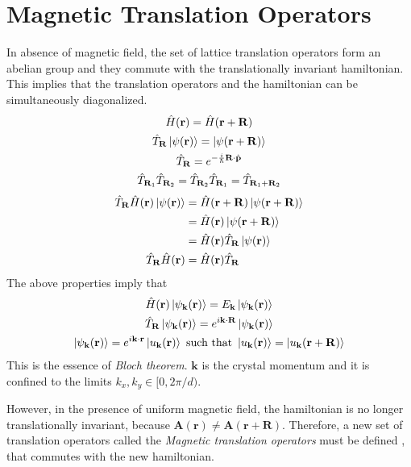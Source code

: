 \section{Magnetic Translation Operators}
In absence of magnetic field, the set of lattice translation operators form an abelian group and they commute with the translationally invariant hamiltonian. This implies that the translation operators 
and the hamiltonian can be simultaneously diagonalized.
\begin{gather}
\hat{H}(\mathbf{r}) = \hat{H}(\mathbf{r} + \mathbf{R}) \nonumber \\
 \hat{T}_{\mathbf{R}}\ket{\psi(\mathbf{r})} = \ket{\psi(\mathbf{r} + \mathbf{R})} \\
 \hat{T}_{\mathbf{R}} = e^{-\frac{i}{\hbar}\mathbf{R}\cdot\hat{\mathbf{p}}} \\
 \hat{T}_{\mathbf{R}_1}\hat{T}_{\mathbf{R}_2} = \hat{T}_{\mathbf{R}_2}\hat{T}_{\mathbf{R}_1} = \hat{T}_{\mathbf{R}_1 + \mathbf{R}_2}
\end{gather}
\begin{align}
 \hat{T}_{\mathbf{R}}\hat{H}(\mathbf{r})\ket{\psi(\mathbf{r})} &= \hat{H}(\mathbf{r} + \mathbf{R})\ket{\psi(\mathbf{r} + \mathbf{R})} \nonumber \\
 &= \hat{H}(\mathbf{r})\ket{\psi(\mathbf{r} + \mathbf{R})} \nonumber \\
 &= \hat{H}(\mathbf{r})\hat{T}_{\mathbf{R}}\ket{\psi({\mathbf{r})}} \nonumber \\
 \hat{T}_{\mathbf{R}}\hat{H}(\mathbf{r}) &= \hat{H}(\mathbf{r})\hat{T}_{\mathbf{R}}
\end{align} The above properties imply that \cite{ashcroft2010solid, snoke2009solid, jain2007composite}
\begin{gather}
 \hat{H}(\mathbf{r})\ket{\psi_{\mathbf{k}}(\mathbf{r})} = E_{\mathbf{k}}\ket{\psi_{\mathbf{k}}(\mathbf{r})} \\
 \hat{T}_{\mathbf{R}}\ket{\psi_{\mathbf{k}}(\mathbf{r})} = e^{i\mathbf{k}\cdot\mathbf{R}}\ket{\psi_{\mathbf{k}}(\mathbf{r})} \\
 \ket{\psi_{\mathbf{k}}(\mathbf{r})} = e^{i\mathbf{k}\cdot\mathbf{r}}\ket{u_{\mathbf{k}}(\mathbf{r})} \text{ such that } \ket{u_{\mathbf{k}}(\mathbf{r})} = \ket{u_{\mathbf{k}}(\mathbf{r} + \mathbf{R})}
\end{gather} This is the essence of \emph{Bloch theorem}. $\mathbf{k}$ is the crystal momentum and it is confined to the limits $k_{x}, k_{y} \in [0, 2\pi/d)$.

However, in the presence of uniform magnetic field, the hamiltonian is no longer translationally invariant, because $\mathbf{A}(\mathbf{r}) \neq \mathbf{A}(\mathbf{r} + \mathbf{R})$.
Therefore, a new set of translation operators called the \emph{Magnetic translation operators} must be defined \cite{zak1964magnetic,brown1964bloch,fischbeck1970theory,bernevig2013topological,jain2007composite,kohmoto1985topological,florek1997local}, that commutes with the new hamiltonian.

